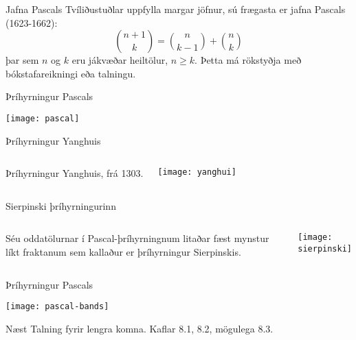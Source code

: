 \documentclass{beamer}
\begin{document}
\begin{frame}{Jafna Pascals}
Tvíliðustuðlar uppfylla margar jöfnur, sú frægasta er jafna Pascals (1623-1662):
\[
\binom{n+1}{k} = \binom{n}{k-1} + \binom{n}{k}
\]
þar sem $n$ og $k$ eru jákvæðar heiltölur, $n \geq k$. Þetta má rökstyðja með bókstafareikningi eða talningu.
\end{frame}

\begin{frame}{Þríhyrningur Pascals}
\begin{center}
\texttt{[image: pascal]}
\end{center}
\end{frame}

\begin{frame}{Þríhyrningur Yanghuis}
\begin{columns}
Þríhyrningur Yanghuis, frá 1303.
\begin{center}
\texttt{[image: yanghui]}
\end{center}
\end{columns}
\end{frame}

\begin{frame}{Sierpinski þríhyrningurinn}
\begin{columns}
Séu oddatölurnar í Pascal-þríhyrningnum litaðar fæst mynstur líkt fraktanum sem kallaður er þríhyrningur Sierpinskis.
\begin{center}
\texttt{[image: sierpinski]}
\end{center}

\end{columns}

\end{frame}

\begin{frame}{Þríhyrningur Pascals}
\begin{center}
\texttt{[image: pascal-bands]}
\end{center}
\end{frame}

\begin{frame}{Næst}
Talning fyrir lengra komna. Kaflar 8.1, 8.2, mögulega 8.3.
\end{frame}
\end{document}

